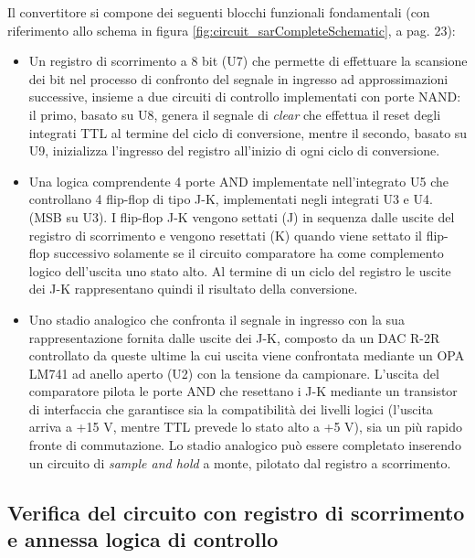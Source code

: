 \documentclass[journal]{IEEEtran}
\begin{document}
Il convertitore si compone dei seguenti blocchi funzionali fondamentali (con riferimento allo schema in figura \ref{fig:circuit_sarCompleteSchematic}, a pag. 23):
\begin{itemize}
    \item Un registro di scorrimento a 8 bit (U7) che permette di effettuare la scansione dei bit nel processo di confronto del segnale in ingresso ad approssimazioni successive, insieme a due circuiti di controllo implementati con porte NAND: il primo, basato su U8, genera il segnale di \textit{clear} che effettua il reset degli integrati TTL al termine del ciclo di conversione, mentre il secondo, basato su U9, inizializza l'ingresso del registro all'inizio di ogni ciclo di conversione.
    \item Una logica comprendente 4 porte AND implementate nell'integrato U5 che controllano 4 flip-flop di tipo J-K, implementati negli integrati U3 e U4. (MSB su U3). I flip-flop J-K vengono settati (J) in sequenza dalle uscite del registro di scorrimento e vengono resettati (K) quando viene settato il flip-flop successivo solamente se il circuito comparatore ha come complemento logico dell'uscita uno stato alto. Al termine di un ciclo del registro le uscite dei J-K rappresentano quindi il risultato della conversione.
    \item Uno stadio analogico che confronta il segnale in ingresso con la sua rappresentazione fornita dalle uscite dei J-K, composto da un DAC R-2R controllato da queste ultime la cui uscita viene confrontata mediante un OPA LM741 ad anello aperto (U2) con la tensione da campionare. L'uscita del comparatore pilota le porte AND che resettano i J-K mediante un transistor di interfaccia che garantisce sia la compatibilità dei livelli logici (l'uscita arriva a +15 V, mentre TTL prevede lo stato alto a +5 V), sia un più rapido fronte di commutazione. Lo stadio analogico può essere completato inserendo un circuito di \textit{sample and hold} a monte, pilotato dal registro a scorrimento.
    
\end{itemize}
 

\subsection{Verifica del circuito con registro di scorrimento e annessa logica di controllo}
\end{document}
